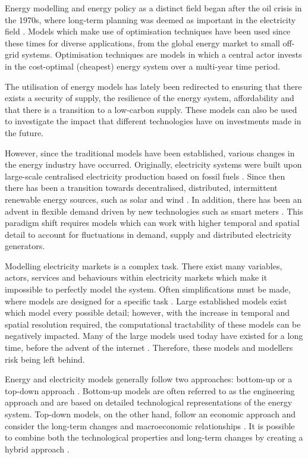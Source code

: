 Energy modelling and energy policy as a distinct field began after the oil crisis in the 1970s, where long-term planning was deemed as important in the electricity field \cite{Craig2002}. Models which make use of optimisation techniques have been used since these times for diverse applications, from the global energy market to small off-grid systems. Optimisation techniques are models in which a central actor invests in the cost-optimal (cheapest) energy system over a multi-year time period.

The utilisation of energy models has lately been redirected to ensuring that there exists a security of supply, the resilience of the energy system, affordability and that there is a transition to a low-carbon supply. These models can also be used to investigate the impact that different technologies have on investments made in the future. 

However, since the traditional models have been established, various changes in the energy industry have occurred. Originally, electricity systems were built upon large-scale centralised electricity production based on fossil fuels \cite{foxon2010developing}. Since then there has been a transition towards decentralised, distributed, intermittent renewable energy sources, such as solar and wind \cite{IEA2015a}. In addition, there has been an advent in flexible demand driven by new technologies such as smart meters \cite{avancini2019energy}. This paradigm shift requires models which can work with higher temporal and spatial detail to account for fluctuations in demand, supply and distributed electricity generators.

Modelling electricity markets is a complex task. There exist many variables, actors, services and behaviours within electricity markets which make it impossible to perfectly model the system. Often simplifications must be made, where models are designed for a specific task \cite{Pfenninger2014}. Large established models exist which model every possible detail; however, with the increase in temporal and spatial resolution required, the computational tractability of these models can be negatively impacted. Many of the large models used today have existed for a long time, before the advent of the internet \cite{Pfenninger2014}. Therefore, these models and modellers risk being left behind.

Energy and electricity models generally follow two approaches: bottom-up or a top-down approach \cite{Ringkjob2018}. Bottom-up models are often referred to as the engineering approach and are based on detailed technological representations of the energy system. Top-down models, on the other hand, follow an economic approach and consider the long-term changes and macroeconomic relationships \cite{Mai2013}. It is possible to combine both the technological properties and long-term changes by creating a hybrid approach \cite{Fortes2014}.




